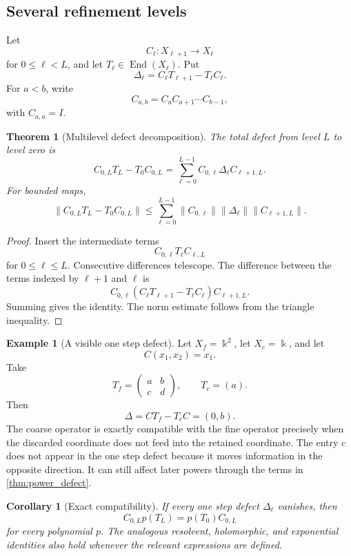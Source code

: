 \documentclass{aomart}
\newtheorem{theorem}{Theorem}[section]
\newtheorem{corollary}[corollary]{Corollary}
\theoremstyle{definition}
\newtheorem{example}[example]{Example}
\theoremstyle{remark}
\newcommand{\bbk}{\Bbbk}
\newcommand{\End}{\operatorname{End}}
\begin{document}
\subsection{Several refinement levels}

Let
\[
C_\ell:X_{\ell+1}\longrightarrow X_\ell
\]
for $0\leq\ell<L$, and let $T_\ell\in\End(X_\ell)$.  Put
\[
\Delta_\ell=C_\ell T_{\ell+1}-T_\ell C_\ell.
\]
For $a<b$, write
\[
C_{a,b}=C_aC_{a+1}\cdots C_{b-1},
\]
with $C_{a,a}=I$.

\begin{theorem}[Multilevel defect decomposition]\label{thm:multilevel_defect}
The total defect from level $L$ to level zero is
\[
C_{0,L}T_L-T_0C_{0,L}
=
\sum_{\ell=0}^{L-1}
C_{0,\ell}\Delta_\ell C_{\ell+1,L}.
\]
For bounded maps,
\[
\|C_{0,L}T_L-T_0C_{0,L}\|
\leq
\sum_{\ell=0}^{L-1}
\|C_{0,\ell}\|
\|\Delta_\ell\|
\|C_{\ell+1,L}\|.
\]
\end{theorem}

\begin{proof}
Insert the intermediate terms
\[
C_{0,\ell}T_\ell C_{\ell,L}
\]
for $0\leq\ell\leq L$.  Consecutive differences telescope.  The difference between the terms indexed by $\ell+1$ and $\ell$ is
\[
C_{0,\ell}(C_\ell T_{\ell+1}-T_\ell C_\ell)C_{\ell+1,L}.
\]
Summing gives the identity.  The norm estimate follows from the triangle inequality.
\end{proof}

\begin{example}[A visible one step defect]\label{ex:defect_example}
Let $X_f=\bbk^2$, let $X_c=\bbk$, and let
\[
C(x_1,x_2)=x_1.
\]
Take
\[
T_f=
\begin{pmatrix}
a&b\\
c&d
\end{pmatrix},
\qquad
T_c=(a).
\]
Then
\[
\Delta=CT_f-T_cC=(0,b).
\]
The coarse operator is exactly compatible with the fine operator precisely when the discarded coordinate does not feed into the retained coordinate.  The entry $c$ does not appear in the one step defect because it moves information in the opposite direction.  It can still affect later powers through the terms in \cref{thm:power_defect}.
\end{example}

\begin{corollary}[Exact compatibility]\label{cor:exact_compatibility}
If every one step defect $\Delta_\ell$ vanishes, then
\[
C_{0,L}p(T_L)=p(T_0)C_{0,L}
\]
for every polynomial $p$.  The analogous resolvent, holomorphic, and exponential identities also hold whenever the relevant expressions are defined.
\end{corollary}
\end{document}
